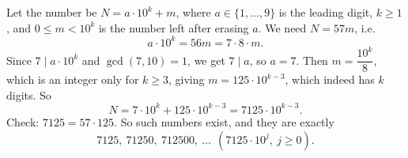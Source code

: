 Let the number be $N=a\cdot10^k+m$, where $a\in\{1,\dots,9\}$ is the leading digit, $k\ge1$, and $0\le m<10^k$ is the number left after erasing $a$. We need $N=57m$, i.e.
\[a\cdot10^k=56m=7\cdot8\cdot m .\]
Since $7\mid a\cdot10^k$ and $\gcd(7,10)=1$, we get $7\mid a$, so $a=7$. Then $m=\dfrac{10^k}{8}$, which is an integer only for $k\ge3$, giving $m=125\cdot10^{k-3}$, which indeed has $k$ digits. So
\[N=7\cdot10^k+125\cdot10^{k-3}=7125\cdot10^{k-3}.\]
Check: $7125=57\cdot125$. So such numbers exist, and they are exactly
\[\boxed{7125,\ 71250,\ 712500,\ \dots\ \ (7125\cdot10^j,\ j\ge0)}.\]
